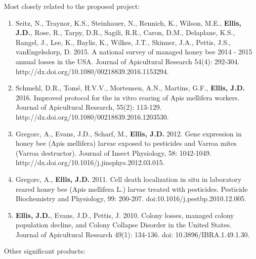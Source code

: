 Most closely related to the proposed project:	
\begin{enumerate}

\item Seitz, N., Traynor, K.S., Steinhauer, N., Rennich, K., Wilson, M.E., \textbf{Ellis, J.D.}, Rose, R., Tarpy, D.R., Sagili, R.R., Caron, D.M., Delaplane, K.S., Rangel, J., Lee, K., Baylis, K., Wilkes, J.T., Skinner, J.A., Pettis, J.S., vanEngelsdorp, D. 2015. A national survey of managed honey bee 2014 - 2015 annual losses in the USA. Journal of Apicultural Research 54(4): 292-304. http://dx.doi.org/10.1080/00218839.2016.1153294.

\item Schmehl, D.R., Tomé, H.V.V., Mortensen, A.N., Martins, G.F., \textbf{Ellis, J.D.} 2016. Improved protocol for the in vitro rearing of Apis mellifera workers. Journal of Apicultural Research, 55(2): 113-129. http://dx.doi.org/10.1080/00218839.2016.1203530. 

\item Gregorc, A., Evans, J.D., Scharf, M., \textbf{Ellis, J.D.} 2012. Gene expression in honey bee (Apis mellifera) larvae exposed to pesticides and Varroa mites (Varroa destructor). Journal of Insect Physiology, 58: 1042-1049. http://dx.doi.org/10.1016/j.jinsphys.2012.03.015.
\item Gregorc, A., \textbf{Ellis, J.D.} 2011. Cell death localization in situ in laboratory reared honey bee (Apis mellifera L.) larvae treated with pesticides. Pesticide Biochemistry and Physiology, 99: 200-207. doi:10.1016/j.pestbp.2010.12.005.
\item \textbf{Ellis, J.D.}, Evans, J.D., Pettis, J. 2010. Colony losses, managed colony population decline, and Colony Collapse Disorder in the United States. Journal of Apicultural Research 49(1): 134-136. doi: 10.3896/IBRA.1.49.1.30.
\end{enumerate}
Other significant products:
